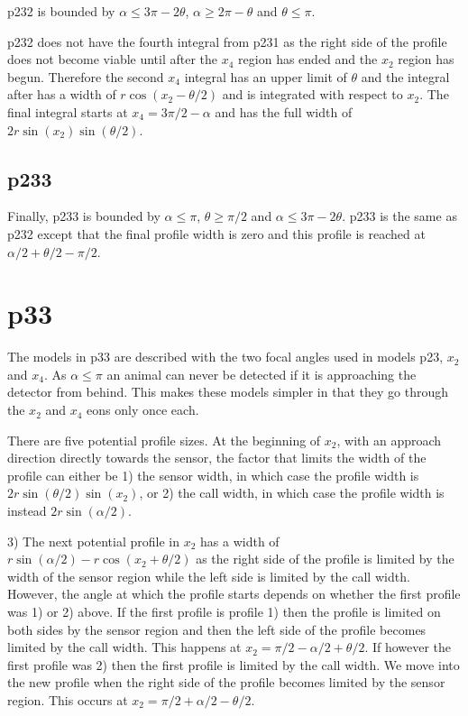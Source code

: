 p232 is bounded by $\alpha \le 3\pi - 2\theta$, $\alpha\ge 2\pi-\theta$ and $\theta\le\pi$.

p232 does not have the fourth integral from p231 as the right side of the profile does not become viable until after the $x_4$ region has ended and the $x_2$ region has begun. Therefore the second $x_4$ integral has an upper limit of $\theta $ and the integral after has a width of $r\cos(x_2 - \theta/2)$ and is integrated with respect to $x_2$. The final integral starts at $x_4 = 3\pi/2 - \alpha$ and has the full width of $2r\sin(x_2)\sin(\theta/2)$.



\subsection{p233} \label{p233}

Finally, p233 is bounded by $\alpha\le \pi$, $\theta\ge \pi/2$ and $\alpha \le 3\pi - 2\theta$. p233 is the same as p232 except that the final profile width is zero and this profile is reached at $\alpha/2+\theta/2-\pi/2$. 



\section{p33} \label{p33}
 
The models in p33 are described with the two focal angles used in models p23, $x_2$ and $x_4$. As $\alpha \le\pi$ an animal can never be detected if it is approaching the detector from behind. This makes these models simpler in that they go through the $x_2$ and $x_4$ eons only once each. 

There are five potential profile sizes. At the beginning of $x_2$, with an approach direction directly towards the sensor, the factor that limits the width of the profile can either be 1) the sensor width,  in which case the profile width is $2r\sin\left(\theta/2\right)\sin(x_2)$, or 2) the call width, in which case the profile width is instead $2r\sin(\alpha /2)$. 

3) The next potential profile in $x_2$ has a width of $r\sin(\alpha/2) - r\cos(x_2 + \theta/2)$ as the right side of the profile is limited by the width of the sensor region while the left side is limited by the call width. However, the angle at which the profile starts depends on whether the first profile was 1) or 2) above. If the first profile is profile 1) then the profile is limited on both sides by the sensor region and then the left side of the profile becomes limited by the call width. This happens at $x_2 = \pi/2 - \alpha/2 + \theta/2$. If however the first profile was 2) then the first profile is limited by the call width. We move into the new profile when the right side of the profile becomes limited by the sensor region. This occurs at $x_2 = \pi/2 + \alpha/2 - \theta/2$.


